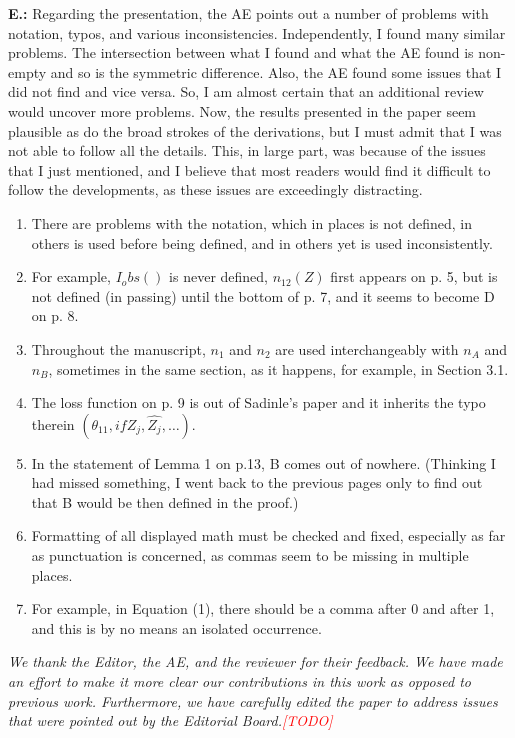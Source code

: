 \documentclass[letterpaper, parskip]{scrartcl}
\newcommand{\pointRaised}[2]{%
	\textbf{#1.\theresponsectr:} #2
}
\newcounter{responsectr}[section]     %
\newcommand{\reply}[1]{%
	\refstepcounter{responsectr}%
		\begin{tcolorbox}
			\itshape #1
		\end{tcolorbox}
}
\newcommand{\todo}{\textcolor{red}{[TODO]}\xspace}
\begin{document}
	\pointRaised{E}{%
	Regarding the presentation, the AE points out a number of problems with notation, typos, and various inconsistencies.  Independently, I found many similar problems.  The intersection between what I found and what the AE found is non-empty and so is the symmetric difference.  Also, the AE found some issues that I did not find and vice versa.  So, I am almost certain that an additional review would uncover more problems.  Now, the results presented in the paper seem plausible as do the broad strokes of the derivations, but I must admit that I was not able to follow all the details. This, in large part, was because of the issues that I just mentioned, and I believe that most readers would find it difficult to follow the developments, as these issues are exceedingly distracting.
	
	\begin{enumerate}
	\item There are problems with the notation, which in places is not defined, in others is used before being defined, and in others yet is used inconsistently.  
	\item For example, $I_obs()$ is never defined, $n_12(Z)$ first appears on p. 5, but is not defined (in passing) until the bottom of p. 7, and it seems to become D on p. 8.  
	\item Throughout the manuscript, $n_1$ and $n_2$ are used interchangeably with $n_A$ and $n_B$, sometimes in the same section, as it happens, for example, in Section 3.1.  
	\item The loss function on p. 9 is out of Sadinle’s paper and it inherits the typo therein $(\theta_11, if Z_j, \hat{Z_j}, \ldots)$. 
	\item  In the statement of Lemma 1 on p.13, B comes out of nowhere.  (Thinking I had missed something, I went back to the previous pages only to find out that B would be then defined in the proof.)  
	\item Formatting of all displayed math must be checked and fixed, especially as far as punctuation is concerned, as commas seem to be missing in multiple places.  
	\item For example, in Equation (1), there should be a comma after 0 and after 1, and this is by no means an isolated occurrence.
	\end{enumerate}
	}
	
\reply{%
	We thank the Editor, the AE, and the reviewer for their feedback. We have made an effort to make it more clear our contributions in this work as opposed to previous work. Furthermore, we have carefully edited the paper to address issues that were pointed out by the Editorial Board.\todo
	}
	
\end{document}
